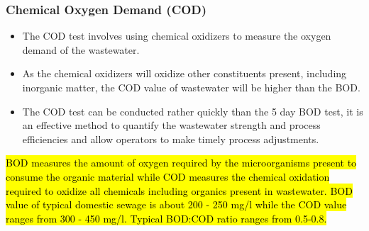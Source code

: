 \documentclass{article}
\begin{document}
			    \subsubsection{Chemical Oxygen Demand (COD)}
			      	\begin{itemize}
			      		\item The COD test involves using chemical oxidizers to measure the oxygen demand of the wastewater.
			      		\item As the chemical oxidizers will oxidize other constituents present, including inorganic matter, the COD value of wastewater will be higher than the BOD.  
			      		\item The COD test can be conducted rather quickly than the 5 day BOD test, it is an effective method to quantify the wastewater strength and process efficiencies and allow operators to make timely process adjustments.
			      	\end{itemize}


		
			\hl{BOD measures the amount of oxygen required by the microorganisms present to consume the organic material while COD measures the chemical oxidation required to oxidize all chemicals including organics present in wastewater.  BOD value of typical domestic sewage is about 200 - 250 mg/l while the COD value ranges from 300 - 450 mg/l.  Typical BOD:COD ratio ranges from 0.5-0.8.}\\
\end{document}
